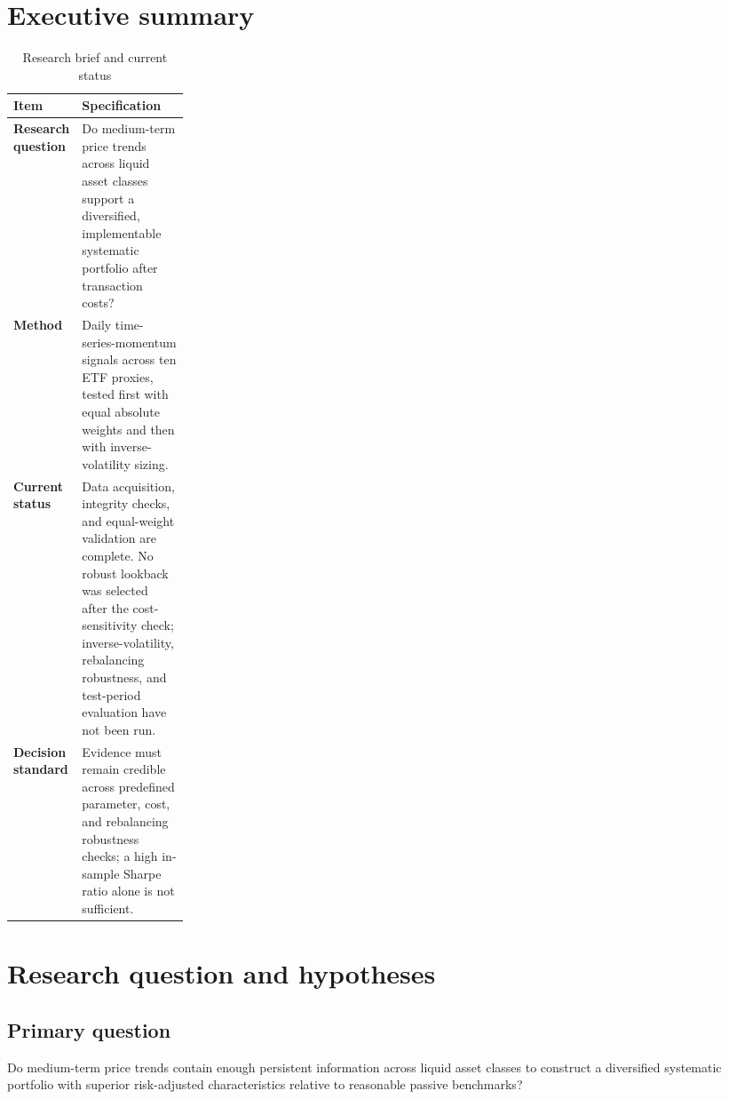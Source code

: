 \documentclass[11pt,a4paper]{article}
\begin{document}


\section*{Executive summary}
\begin{table}[htbp]
\centering
\caption{Research brief and current status}
\begin{tabularx}{\linewidth}{@{}>{\bfseries}p{0.23\linewidth}X@{}}
\toprule
\rowcolor{ReportMist}
\textbf{Item} & \textbf{Specification} \\
\midrule
Research question & Do medium-term price trends across liquid asset classes support a diversified, implementable systematic portfolio after transaction costs? \\
Method & Daily time-series-momentum signals across ten ETF proxies, tested first with equal absolute weights and then with inverse-volatility sizing. \\
Current status & Data acquisition, integrity checks, and equal-weight validation are complete. No robust lookback was selected after the cost-sensitivity check; inverse-volatility, rebalancing robustness, and test-period evaluation have not been run. \\
Decision standard & Evidence must remain credible across predefined parameter, cost, and rebalancing robustness checks; a high in-sample Sharpe ratio alone is not sufficient. \\
\bottomrule
\end{tabularx}
\end{table}

\section{Research question and hypotheses}
\subsection{Primary question}
Do medium-term price trends contain enough persistent information across liquid asset classes to construct a diversified systematic portfolio with superior risk-adjusted characteristics relative to reasonable passive benchmarks?
\end{document}
